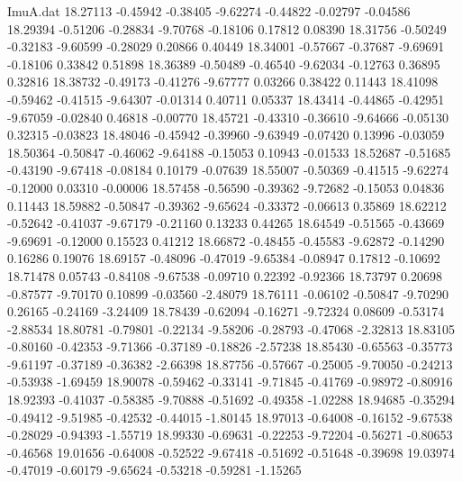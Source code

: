 \begin{filecontents}{ImuA.dat}
  18.27113   -0.45942   -0.38405   -9.62274   -0.44822   -0.02797   -0.04586
  18.29394   -0.51206   -0.28834   -9.70768   -0.18106    0.17812    0.08390
  18.31756   -0.50249   -0.32183   -9.60599   -0.28029    0.20866    0.40449
  18.34001   -0.57667   -0.37687   -9.69691   -0.18106    0.33842    0.51898
  18.36389   -0.50489   -0.46540   -9.62034   -0.12763    0.36895    0.32816
  18.38732   -0.49173   -0.41276   -9.67777    0.03266    0.38422    0.11443
  18.41098   -0.59462   -0.41515   -9.64307   -0.01314    0.40711    0.05337
  18.43414   -0.44865   -0.42951   -9.67059   -0.02840    0.46818   -0.00770
  18.45721   -0.43310   -0.36610   -9.64666   -0.05130    0.32315   -0.03823
  18.48046   -0.45942   -0.39960   -9.63949   -0.07420    0.13996   -0.03059
  18.50364   -0.50847   -0.46062   -9.64188   -0.15053    0.10943   -0.01533
  18.52687   -0.51685   -0.43190   -9.67418   -0.08184    0.10179   -0.07639
  18.55007   -0.50369   -0.41515   -9.62274   -0.12000    0.03310   -0.00006
  18.57458   -0.56590   -0.39362   -9.72682   -0.15053    0.04836    0.11443
  18.59882   -0.50847   -0.39362   -9.65624   -0.33372   -0.06613    0.35869
  18.62212   -0.52642   -0.41037   -9.67179   -0.21160    0.13233    0.44265
  18.64549   -0.51565   -0.43669   -9.69691   -0.12000    0.15523    0.41212
  18.66872   -0.48455   -0.45583   -9.62872   -0.14290    0.16286    0.19076
  18.69157   -0.48096   -0.47019   -9.65384   -0.08947    0.17812   -0.10692
  18.71478    0.05743   -0.84108   -9.67538   -0.09710    0.22392   -0.92366
  18.73797    0.20698   -0.87577   -9.70170    0.10899   -0.03560   -2.48079
  18.76111   -0.06102   -0.50847   -9.70290    0.26165   -0.24169   -3.24409
  18.78439   -0.62094   -0.16271   -9.72324    0.08609   -0.53174   -2.88534
  18.80781   -0.79801   -0.22134   -9.58206   -0.28793   -0.47068   -2.32813
  18.83105   -0.80160   -0.42353   -9.71366   -0.37189   -0.18826   -2.57238
  18.85430   -0.65563   -0.35773   -9.61197   -0.37189   -0.36382   -2.66398
  18.87756   -0.57667   -0.25005   -9.70050   -0.24213   -0.53938   -1.69459
  18.90078   -0.59462   -0.33141   -9.71845   -0.41769   -0.98972   -0.80916
  18.92393   -0.41037   -0.58385   -9.70888   -0.51692   -0.49358   -1.02288
  18.94685   -0.35294   -0.49412   -9.51985   -0.42532   -0.44015   -1.80145
  18.97013   -0.64008   -0.16152   -9.67538   -0.28029   -0.94393   -1.55719
  18.99330   -0.69631   -0.22253   -9.72204   -0.56271   -0.80653   -0.46568
  19.01656   -0.64008   -0.52522   -9.67418   -0.51692   -0.51648   -0.39698
  19.03974   -0.47019   -0.60179   -9.65624   -0.53218   -0.59281   -1.15265

\end{filecontents}
